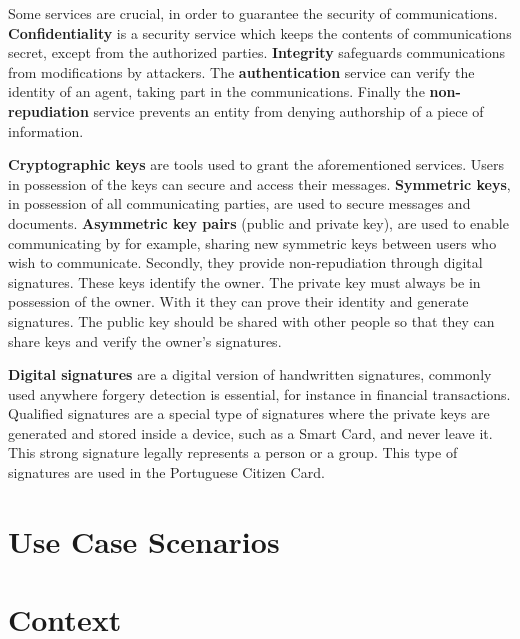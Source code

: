 Some services are crucial, in order to guarantee the security of communications.
\textbf{Confidentiality} is a security service which keeps the contents of communications secret, except from the authorized parties.
\textbf{Integrity} safeguards communications from modifications by attackers.
The \textbf{authentication} service can verify the identity of an agent, taking part in the communications.
Finally the \textbf{non-repudiation} service prevents an entity from denying authorship of a piece of information.

\textbf{Cryptographic keys} are tools used to grant the aforementioned services. Users in possession of the keys can secure and access their messages.
\textbf{Symmetric keys}, in possession of all communicating parties, are used to secure messages and documents.
\textbf{Asymmetric key pairs} (public and private key), are used to enable communicating by for example, sharing new symmetric keys between users who wish to communicate. Secondly, they provide non-repudiation through digital signatures.
These keys identify the owner. The private key must always be in possession of the owner. With it they can prove their identity and generate signatures.
The public key should be shared with other people so that they can share keys and verify the owner's signatures.

\textbf{Digital signatures} are a digital version of handwritten signatures, commonly used anywhere forgery detection is essential, for instance in financial transactions.
Qualified signatures are a special type of signatures where the private keys are generated and stored inside a device, such as a Smart Card, and never leave it.
This strong signature legally represents a person or a group. This type of signatures are used in the Portuguese Citizen Card.

\section{Use Case Scenarios}\label{chap:problem:scenarios}

\section{Context}\label{chap:problem:context}

